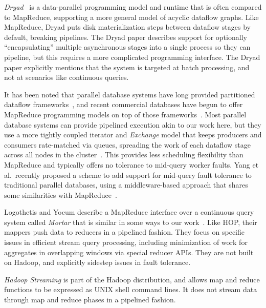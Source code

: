 \emph{Dryad}~\cite{dryad07} is a data-parallel programming model and runtime
that is often compared to MapReduce, supporting a more general model of acyclic
dataflow graphs.  Like MapReduce, Dryad puts disk materialization steps between
dataflow stages by default, breaking pipelines.  The Dryad paper describes
support for optionally ``encapsulating'' multiple asynchronous stages into a
single process so they can pipeline, but this requires a more complicated
programming interface.
The Dryad paper explicitly mentions that the system is targeted at batch processing, and not at scenarios like continuous queries.  

It has been noted that parallel database systems have long provided partitioned
dataflow frameworks~\cite{pavlo09}, and recent commercial databases have begun
to offer MapReduce programming models on top of those
frameworks~\cite{aster,greenplum}.  Most parallel database systems can provide
pipelined execution akin to our work here, but they use a more tightly coupled
iterator and \emph{Exchange} model that keeps producers and consumers
rate-matched via queues, spreading the work of each dataflow stage across all
nodes in the cluster~\cite{exchange}.  This provides less scheduling flexibility
than MapReduce and typically offers no tolerance to mid-query worker
faults. Yang et al.\ recently proposed a scheme to add support for mid-query
fault tolerance to traditional parallel databases, using a middleware-based
approach that shares some similarities with MapReduce~\cite{osprey-icde}.

Logothetis and Yocum describe a MapReduce interface over a continuous query
system called \emph{Mortar} that is similar in some ways to our
work~\cite{logoyocum08}.  Like HOP, their mappers push data to reducers in a
pipelined fashion.  They focus on specific issues in efficient stream query
processing, including minimization of work for aggregates in overlapping windows
via special reducer APIs.  They are not built on Hadoop, and explicitly sidestep
issues in fault tolerance.

\emph{Hadoop Streaming} is part of the Hadoop distribution, and allows map and
reduce functions to be expressed as UNIX shell command lines.  It does not
stream data through map and reduce phases in a pipelined fashion.

